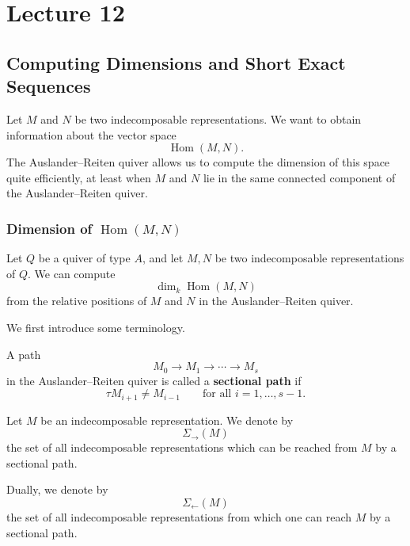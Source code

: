 \documentclass[11pt, a4paper]{report}
\begin{document}
\chapter{Lecture 12}


\section{Computing Dimensions and Short Exact Sequences}

Let \(M\) and \(N\) be two indecomposable representations. We want to obtain
information about the vector space
\[
    \operatorname{Hom}(M,N).
\]
The Auslander--Reiten quiver allows us to compute the dimension of this space
quite efficiently, at least when \(M\) and \(N\) lie in the same connected component
of the Auslander--Reiten quiver.

\subsection{Dimension of \texorpdfstring{\(\operatorname{Hom}(M,N)\)}{Hom(M,N)}}

Let \(Q\) be a quiver of type \(A\), and let \(M,N\) be two indecomposable
representations of \(Q\). We can compute
\[
    \dim_k \operatorname{Hom}(M,N)
\]
from the relative positions of \(M\) and \(N\) in the Auslander--Reiten quiver.

We first introduce some terminology.

\begin{definition}
    A path
    \[
        M_0 \longrightarrow M_1 \longrightarrow \cdots \longrightarrow M_s
    \]
    in the Auslander--Reiten quiver is called a \textbf{sectional path} if
    \[
        \tau M_{i+1} \neq M_{i-1}
        \qquad
        \text{for all } i=1,\dots,s-1.
    \]
\end{definition}

\begin{definition}
    Let \(M\) be an indecomposable representation.
    We denote by
    \[
        \Sigma_{\rightarrow}(M)
    \]
    the set of all indecomposable representations which can be reached from \(M\)
    by a sectional path.

    Dually, we denote by
    \[
        \Sigma_{\leftarrow}(M)
    \]
    the set of all indecomposable representations from which one can reach \(M\)
    by a sectional path.
\end{definition}
\end{document}
